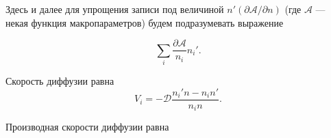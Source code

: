 \documentclass[12pt]{article}
\begin{document}
Здесь и далее для упрощения записи под величиной $n' (\partial \mathcal{A} / \partial n)$ (где $\mathcal{A}$ --- некая функция макропараметров) будем подразумевать выражение

\begin{equation}
  \sum_{i} \frac{\partial \mathcal{A}}{n_{i}}n_{i}'.
\end{equation}

Скорость диффузии равна
\begin{equation}
  V_{i} = -\mathcal{D} \frac{n_{i}'n - n_{i}n'}{n_{i}n}.
\end{equation}





Производная скорости диффузии равна

\end{document}
